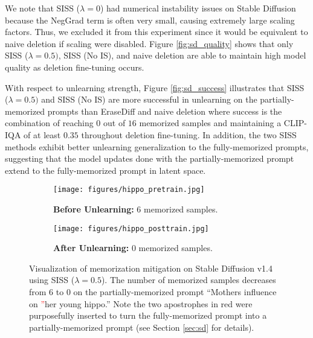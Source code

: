 \documentclass{article} \usepackage{iclr2025_conference,times}
\begin{document}
We note that SISS ($\lambda=0$) had numerical instability issues on Stable Diffusion because the NegGrad term is often very small, causing extremely large scaling factors. Thus, we excluded it from this experiment since it would be equivalent to naive deletion if scaling were disabled. Figure \ref{fig:sd_quality} shows that only SISS ($\lambda=0.5)$, SISS (No IS), and naive deletion are able to maintain high model quality as deletion fine-tuning occurs.

With respect to unlearning strength, Figure \ref{fig:sd_success} illustrates that SISS ($\lambda=0.5)$ and SISS (No IS) are more successful in unlearning on the partially-memorized prompts than EraseDiff and naive deletion where success is the combination of reaching $0$ out of $16$ memorized samples and maintaining a CLIP-IQA of at least $0.35$ throughout deletion fine-tuning. In addition, the two SISS methods exhibit better unlearning generalization to the fully-memorized prompts, suggesting that the model updates done with the partially-memorized prompt extend to the fully-memorized prompt in latent space.


\begin{figure}
    \centering
    \begin{subfigure}[b]{0.475\textwidth}
        \centering
        \texttt{[image: figures/hippo\_pretrain.jpg]}
        \caption*{\textbf{Before Unlearning:} 6 memorized samples.}
    \end{subfigure}\hfill
    \begin{subfigure}[b]{0.475\textwidth}
        \centering
        \texttt{[image: figures/hippo\_posttrain.jpg]}
        \caption*{\textbf{After Unlearning:} 0 memorized samples.}
    \end{subfigure}
    \caption{Visualization of memorization mitigation on Stable Diffusion v1.4 using SISS ($\lambda=0.5$). The number of memorized samples decreases from $6$ to $0$ on the partially-memorized prompt ``Mothers influence on \textcolor{red}{''}her young hippo.'' Note the two apostrophes in red were purposefully inserted to turn the fully-memorized prompt into a partially-memorized prompt (see Section \ref{sec:sd} for details).}
    \label{fig:sd_unlearning_viz}
\end{figure}
\end{document}
